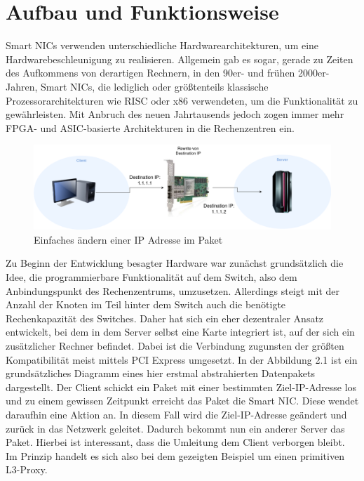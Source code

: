 \section{Aufbau und Funktionsweise}
Smart NICs verwenden unterschiedliche Hardwarearchitekturen, um eine Hardwarebeschleunigung zu realisieren. Allgemein gab es sogar, gerade zu Zeiten des Aufkommens von derartigen Rechnern, in den 90er- und frühen 2000er-Jahren, Smart NICs, die lediglich oder größtenteils klassische Prozessorarchitekturen wie RISC oder x86 verwendeten, um die Funktionalität zu gewährleisten. Mit Anbruch des neuen Jahrtausends jedoch zogen immer mehr FPGA- und ASIC-basierte Architekturen in die Rechenzentren ein.
\begin{figure}
    \centering
    \includegraphics[width=1\linewidth]{images/GrundaufbauSmartNIC.drawio.png}
    \caption{Einfaches ändern einer IP Adresse im Paket}
    \label{fig:enter-label}
\end{figure}
Zu Beginn der Entwicklung besagter Hardware war zunächst grundsätzlich die Idee, die programmierbare Funktionalität auf dem Switch, also dem Anbindungspunkt des Rechenzentrums, umzusetzen. Allerdings steigt mit der Anzahl der Knoten im Teil hinter dem Switch auch die benötigte Rechenkapazität des Switches. Daher hat sich ein eher dezentraler Ansatz entwickelt, bei dem in dem Server selbst eine Karte integriert ist, auf der sich ein zusätzlicher Rechner befindet. Dabei ist die Verbindung zugunsten der größten Kompatibilität meist mittels PCI Express umgesetzt. In der Abbildung 2.1 ist ein grundsätzliches Diagramm eines hier erstmal abstrahierten Datenpakets dargestellt. Der Client schickt ein Paket mit einer bestimmten Ziel-IP-Adresse los und zu einem gewissen Zeitpunkt erreicht das Paket die Smart NIC. Diese wendet daraufhin eine Aktion an. In diesem Fall wird die Ziel-IP-Adresse geändert und zurück in das Netzwerk geleitet. Dadurch bekommt nun ein anderer Server das Paket. Hierbei ist interessant, dass die Umleitung dem Client verborgen bleibt. Im Prinzip handelt es sich also bei dem gezeigten Beispiel um einen primitiven L3-Proxy.
